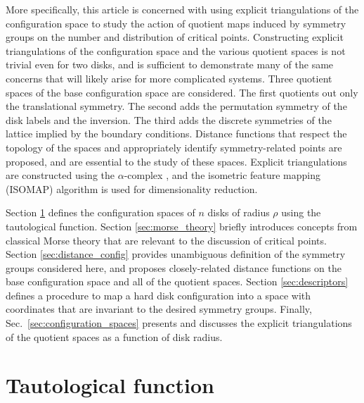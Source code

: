 \documentclass[default,iicol]{sn-jnl}%
\theoremstyle{thmstyleone}%
\theoremstyle{thmstyletwo}%
\theoremstyle{thmstylethree}%
\begin{document}
More specifically, this article is concerned with using explicit triangulations of the configuration space to study the action of quotient maps induced by symmetry groups on the number and distribution of critical points. Constructing explicit triangulations of the configuration space and the various quotient spaces is not trivial even for two disks, and is sufficient to demonstrate many of the same concerns that will likely arise for more complicated systems. Three quotient spaces of the base configuration space are considered. The first quotients out only the translational symmetry. The second adds the permutation symmetry of the disk labels and the inversion. The third adds the discrete symmetries of the lattice implied by the boundary conditions. Distance functions that respect the topology of the spaces and appropriately identify symmetry-related points are proposed, and are essential to the study of these spaces. Explicit triangulations are constructed using the $\alpha$-complex \cite{edelsbrunner1983shape}, and the isometric feature mapping (ISOMAP) algorithm \cite{Tenenbaum2319} is used for dimensionality reduction.

Section \ref{sec:tautological_function} defines the configuration spaces of $n$ disks of radius $\rho$ using the tautological function. Section \ref{sec:morse_theory} briefly introduces concepts from classical Morse theory that are relevant to the discussion of critical points. Section \ref{sec:distance_config} provides unambiguous definition of the symmetry groups considered here, and proposes closely-related distance functions on the base configuration space and all of the quotient spaces. Section \ref{sec:descriptors} defines a procedure to map a hard disk configuration into a space with coordinates that are invariant to the desired symmetry groups. Finally, Sec.\ \ref{sec:configuration_spaces} presents and discusses the explicit triangulations of the quotient spaces as a function of disk radius.

\section{Tautological function}
\label{sec:tautological_function}
\end{document}
